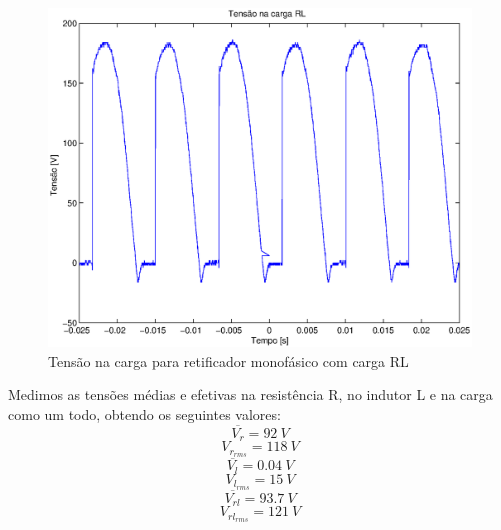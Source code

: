 \documentclass{article}
\begin{document}
\begin{figure}[H]
	\centering
	\includegraphics[width=0.7\linewidth]{dados/RL/r_vrl}
	\caption{Tensão na carga para retificador monofásico com carga RL}
	\label{fig:rlvrl}
\end{figure}
Medimos as tensões médias e efetivas na resistência R, no indutor L e na carga como um todo, obtendo os seguintes valores:
\begin{equation}
\overline{V_r} = 92\ V
\end{equation}
\begin{equation}
V_{r_{rms}} =  118\ V
\end{equation}
\begin{equation}
\overline{V_l} = 0.04\ V
\end{equation}
\begin{equation}
V_{l_{rms}} =  15\ V
\end{equation}
\begin{equation}
\overline{V_{rl}} = 93.7\ V
\end{equation}
\begin{equation}
V_{{rl}_{rms}} =  121\ V
\end{equation}
\end{document}
